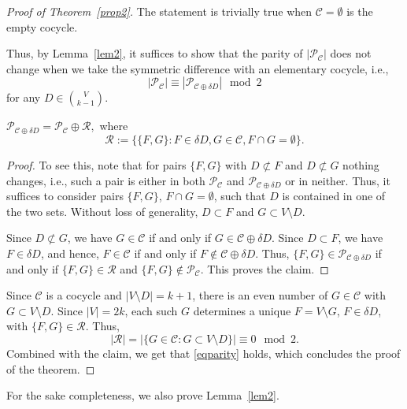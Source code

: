 \documentclass[english,a4paper,nolineno]{lipics-v2019}
\begin{document}
\begin{proof}[Proof of Theorem~\ref{prop2}]
The statement is trivially true when $\mathcal C = \emptyset$ is the empty cocycle.

Thus, by Lemma~\ref{lem2}, it suffices to show that the parity of $|\mathcal P_{\mathcal C}|$ does not change when we take the symmetric difference with an elementary cocycle, i.e., 
\begin{equation}\label{eqparity}|\mathcal P_{\mathcal C}|\equiv |\mathcal P_{\mathcal C\oplus\delta D}|\mod 2\end{equation}
for any $D\in {V\choose k-1}$.
\begin{claim} $\mathcal P_{\mathcal C\oplus\delta D}=\mathcal P_{\mathcal C}\oplus \mathcal R,$ where
$$\mathcal R:=\big\{\{F,G\}: F\in \delta D, G\in \mathcal C, F\cap G=\emptyset \big\}.$$
\end{claim}
\begin{proof}
To see this, note that for pairs $\{F,G\}$ with $D\not \subset F$ and $D\not\subset G$ nothing changes, i.e., such a pair is either in both $\mathcal P_{\mathcal C}$ and $\mathcal P_{\mathcal C\oplus\delta D}$ or in neither. Thus, it suffices to consider pairs $\{F,G\}$, $F\cap G=\emptyset$, such that $D$ is contained in one of the two sets. Without loss of generality, $D\subset F$ and $G\subset V\setminus D$.

Since $D\not\subset G$, we have $G\in \mathcal C$ if and only if $G\in \mathcal C\oplus\delta D$.  Since $D\subset F$, we have $F\in \delta D$, and hence, $F\in \mathcal C$ if and only if $F\not\in \mathcal C\oplus \delta D$. Thus, $\{F,G\} \in \mathcal P_{\mathcal C\oplus\delta D}$ if and only if  $\{F,G\}\in \mathcal{R}$ and  $\{F,G\}\not\in \mathcal{P}_{\mathcal{C}}$. This proves the claim.
\end{proof}

Since $\mathcal C$ is a cocycle and $|V\setminus D|=k+1$, there is an even number of $G\in \mathcal C$ with $G\subset V\setminus D$. Since $|V|=2k$, each such $G$ determines a unique $F=V\setminus G$, $F\in \delta D$, with $\{F,G\}\in \mathcal R$. Thus,
$$|\mathcal R|=\big|\{G\in \mathcal C: G\subset V\setminus D\}\big|\equiv 0\mod 2.$$
Combined with the claim, we get that \eqref{eqparity} holds, which concludes the proof of the theorem.
\end{proof}

For the sake completeness, we also prove Lemma~\ref{lem2}.
\end{document}
